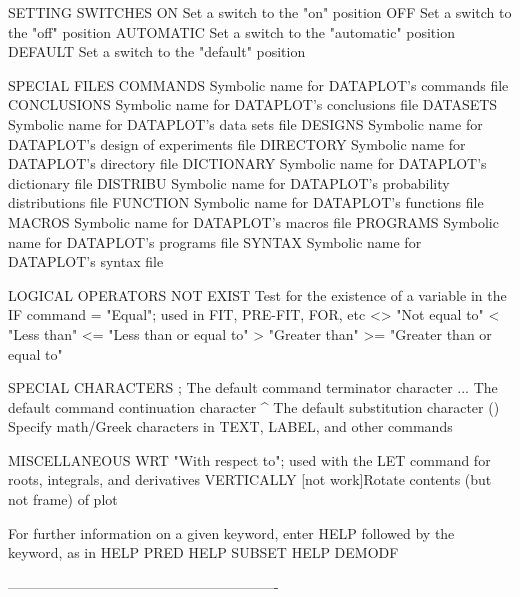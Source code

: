 SETTING SWITCHES
   ON                   Set a switch to the "on" position
   OFF                  Set a switch to the "off" position
   AUTOMATIC            Set a switch to the "automatic" position
   DEFAULT              Set a switch to the "default" position
 
SPECIAL FILES
   COMMANDS             Symbolic name for DATAPLOT's commands file
   CONCLUSIONS          Symbolic name for DATAPLOT's conclusions file
   DATASETS             Symbolic name for DATAPLOT's data sets file
   DESIGNS              Symbolic name for DATAPLOT's design of
                        experiments file
   DIRECTORY            Symbolic name for DATAPLOT's directory file
   DICTIONARY           Symbolic name for DATAPLOT's dictionary file
   DISTRIBU             Symbolic name for DATAPLOT's probability
                        distributions file
   FUNCTION             Symbolic name for DATAPLOT's functions file
   MACROS               Symbolic name for DATAPLOT's macros file
   PROGRAMS             Symbolic name for DATAPLOT's programs file
   SYNTAX               Symbolic name for DATAPLOT's syntax file
 
LOGICAL OPERATORS
   NOT EXIST            Test for the existence of a variable in the IF
                        command
   =                    "Equal"; used in FIT, PRE-FIT, FOR, etc
   <>                   "Not equal to"
   <                    "Less than"
   <=                   "Less than or equal to"
   >                    "Greater than"
   >=                   "Greater than or equal to"
 
SPECIAL CHARACTERS
   ;                    The default command terminator character
   ...                  The default command continuation character
   ^                    The default substitution character
   ()                   Specify math/Greek characters in TEXT, LABEL,
                        and other commands
 
MISCELLANEOUS
   WRT                  "With respect to"; used with the LET command
                        for roots, integrals, and derivatives
   VERTICALLY [not work]Rotate contents (but not frame) of plot
 
For further information on a given keyword, enter HELP   followed by
the keyword, as in
   HELP PRED
   HELP SUBSET
   HELP DEMODF
 
----------------------------------------------------------
 
 
 
 
 
 
 
